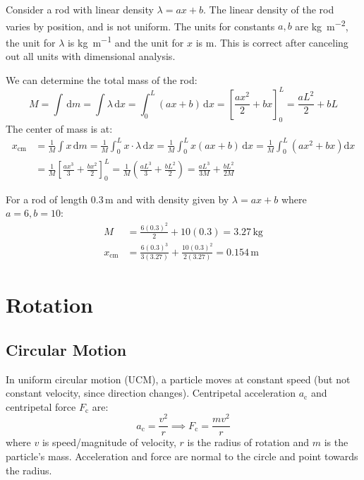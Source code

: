 \documentclass{article}
\newcommand{\example}[2]{\begin{tcolorbox}[title={Example: #1},colback=brown!5!white,colframe=brown!75!black,parbox=false] #2 \end{tcolorbox}}
\begin{document}
\example{Rod with non-uniform linear density}{
	Consider a rod with linear density $\lambda=ax+b$. The linear density of the rod varies by position, and is not uniform. The units for constants $a,b$ are \si{\kilo\gram\per\meter^2}, the unit for $\lambda$ is \si{\kilo\gram\per\meter} and the unit for $x$ is \si{\meter}. This is correct after canceling out all units with dimensional analysis.

	We can determine the total mass of the rod:
	\begin{equation*}
	    M
		=\int \,\mathrm{d}m
		=\int \lambda\,\mathrm{d}x
		=\int_{0}^{L}(ax+b)\,\mathrm{d}x
		=\left[\frac{ax^2}{2}+bx\right]_{0}^{L}
		=\frac{aL^2}{2}+bL
	\end{equation*}
	The center of mass is at:
	\begin{align*}
	    x_ \text{cm}
		&=\frac1M \int x\,\mathrm{d}m
		=\frac1M \int_{0}^{L}x\cdot\lambda\,\mathrm{d}x
		=\frac1M \int_{0}^{L}x(ax+b)\,\mathrm{d}x
		=\frac1M \int_{0}^{L}\left( ax^2+bx \right)\mathrm{d}x \\
		&=\frac1M \left[\frac{ax^3}{3}+\frac{bx^2}{2}\right]_{0}^{L}
		=\frac1M \left( \frac{aL^3}{3}+\frac{bL^2}{2} \right)
		=\frac{aL^3}{3M}+\frac{bL^2}{2M}
	\end{align*}

	For a rod of length $0.3\,\si{\meter}$ and with density given by $\lambda=ax+b$ where $a=6,b=10$:
	\begin{align*}
		M&=\frac{6(0.3)^2}{2}+10(0.3)=3.27\,\si{\kilo\gram} \\
		x_\text{cm}&=\frac{6(0.3)^3}{3(3.27)}+\frac{10(0.3)^2}{2(3.27)}=0.154\,\si{\meter}
	\end{align*}
}

\section{Rotation}
\label{sec:rotation}

\subsection{Circular Motion}

In uniform circular motion (UCM), a particle moves at constant speed (but not constant velocity, since direction changes). Centripetal acceleration $a_\text{c}$ and centripetal force $F_\text{c}$ are:
\begin{equation*}
	a_\text{c}=\frac{v^2}{r}
	\implies F_\text{c}=\frac{mv^2}{r}
\end{equation*}
where $v$ is speed/magnitude of velocity, $r$ is the radius of rotation and $m$ is the particle's mass. Acceleration and force are normal to the circle and point towards the radius.
\end{document}
